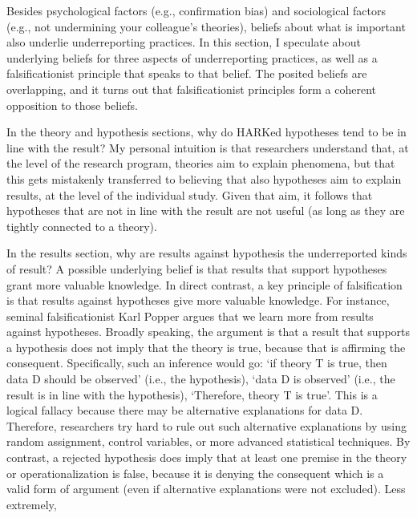 \documentclass[empirical, authordate, meta]{jote-new-article}
\begin{document}
Besides psychological factors (e.g., confirmation bias) and sociological factors (e.g., not undermining your colleague's theories), beliefs about what is important also underlie underreporting practices. In this section, I speculate about underlying beliefs for three aspects of underreporting practices, as well as a falsificationist principle that speaks to that belief. The posited beliefs are overlapping, and it turns out that falsificationist principles form a coherent opposition to those beliefs.






In the theory and hypothesis sections, why do HARKed hypotheses tend to be in line with the result? My personal intuition is that researchers understand that, at the level of the research program, theories aim to explain phenomena, but that this gets mistakenly transferred to believing that also hypotheses aim to explain results, at the level of the individual study. Given that aim, it follows that hypotheses that are not in line with the result are not useful \parencite{Johns2019}(as long as they are tightly connected to a theory).

In the results section, why are results against hypothesis the underreported kinds of result? A possible underlying belief is that results that support hypotheses grant more valuable knowledge. In direct contrast, a key principle of falsification is that results against hypotheses give more valuable knowledge. For instance, seminal falsificationist Karl Popper argues that we learn more from results against hypotheses. Broadly speaking, the argument is that a result that supports a hypothesis does not imply that the theory is true, because that is affirming the consequent. Specifically, such an inference would go: ‘if theory T is true, then data D should be observed' (i.e., the hypothesis), ‘data D is observed' (i.e., the result is in line with the hypothesis), ‘Therefore, theory T is true'. This is a logical fallacy because there may be alternative explanations for data D. Therefore, researchers try hard to rule out such alternative explanations by using random assignment, control variables, or more advanced statistical techniques. By contrast, a rejected hypothesis does imply that at least one premise in the theory or operationalization is false, because it is denying the consequent which is a valid form of argument (even if alternative explanations were not excluded). Less extremely, \parencite{Davis1971}
\end{document}
